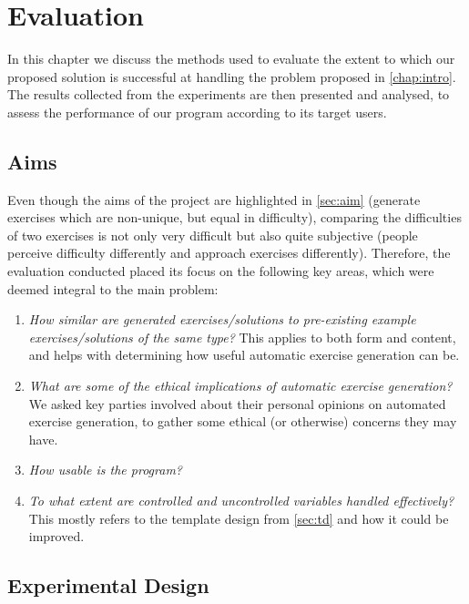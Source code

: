 \documentclass{l4proj}
\begin{document}
\chapter{Evaluation} 
\label{chap:ev}

In this chapter we discuss the methods used to evaluate the extent to which our proposed solution is successful at handling the problem proposed in \autoref{chap:intro}. The results collected from the experiments are then presented and 	analysed, to assess the performance of our program according to its target users.

\section{Aims}
\label{sec:evalAims}

Even though the aims of the project are highlighted in \autoref{sec:aim} (generate exercises which are non-unique, but equal in difficulty), comparing the difficulties of two exercises is not only very difficult but also quite subjective (people perceive difficulty differently and approach exercises differently). Therefore, the evaluation conducted placed its focus on the following key areas, which were deemed integral to the main problem:

\begin{enumerate}
	\item
	\emph{How similar are generated exercises/solutions to pre-existing example exercises/solutions of the same type?} This applies to both form and content, and helps with determining how useful automatic exercise generation can be.
	\item
	\emph{What are some of the ethical implications of automatic exercise generation?} We asked key parties involved about their personal opinions on automated exercise generation, to gather some ethical (or otherwise) concerns they may have.
	\item
	\emph{How usable is the program?} 
	\item
	\emph{To what extent are controlled and uncontrolled variables handled effectively?} This mostly refers to the template design from \autoref{sec:td} and how it could be improved.
\end{enumerate}

\section{Experimental Design}
\label{sec:exp_design}
\end{document}
